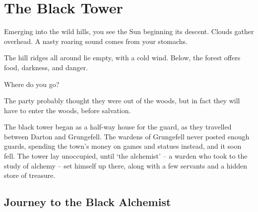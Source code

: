 \chapter{The Black Tower}
\epigraph{
  Emerging into the wild hills, you see the Sun beginning its descent.
  Clouds gather overhead.
  A nasty roaring sound comes from your stomachs.

  The hill ridges all around lie empty, with a cold wind.
  Below, the forest offers food, darkness, and danger.

  Where do you go?
}{}

\begin{multicols}{2}

\noindent
The party probably thought they were out of the woods, but in fact they will have to enter the woods, before salvation.

\begin{exampletext}
  The black tower began as a half-way house for the \gls{guard}, as they travelled between Darton and Grungefell.
  The wardens of Grungefell never posted enough guards, spending the town's money on games and statues instead, and it soon fell.
  The tower lay unoccupied, until `the alchemist' -- a warden who took to the study of alchemy -- set himself up there, along with a few servants and a hidden store of treasure.
\end{exampletext}

\end{multicols}

\section{Journey to the Black Alchemist}

